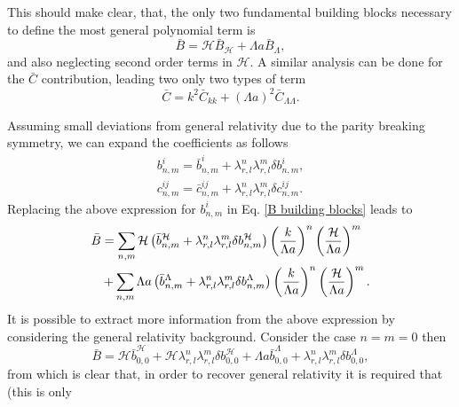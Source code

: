 \documentclass{article}
\begin{document}
This should make clear, that, the only two fundamental building blocks necessary to define the most
general polynomial term is
\begin{equation}
    \label{B building blocks}
    \bar{B} = \mathcal{H}\bar{B}_{\mathcal{H}} + \Lambda a \bar{B}_{\Lambda},
\end{equation}
and also neglecting second order terms in $\mathcal{H}$. A similar analysis can be done for the 
$\bar{C}$ contribution, leading two only two types of term
\begin{equation}
    \label{C building blocks}
    \bar{C} = k^2 \bar{C}_{kk} + \left(\Lambda a\right)^2 \bar{C}_{\Lambda\Lambda}.
\end{equation}

Assuming small deviations from general relativity due to the parity breaking symmetry, we can expand
the coefficients as follows
\begin{align}
    b^{i}_{n,m} = \bar{b}^{i}_{n,m} + \lambda^{n}_{r,l}\lambda^{m}_{r,l} \delta b^{i}_{n,m} \label{B deviation},\\
    c^{ij}_{n,m} = \bar{c}^{ij}_{n,m} + \lambda^{n}_{r,l}\lambda^{m}_{r,l} \delta c^{ij}_{n,m} \label{C deviation}.
\end{align}
Replacing the above expression for $b^{i}_{n,m}$ in Eq. \eqref{B building blocks} leads to
\begin{align}
    \label{gw equation pv}
    \bar{B} & = \sum_{n,m} \mathcal{H}\left(\bar{b}^{\mathcal{H}}_{n,m} 
    + \lambda^{n}_{r,l}\lambda^{m}_{r,l} \delta b^{\mathcal{H}}_{n,m}\right)
    \left(\frac{k}{\Lambda a}\right)^{n}\left(\frac{\mathcal{H}}{\Lambda a}\right)^{m} \notag \\
    & + \sum_{n,m} \Lambda a \left(\bar{b}^{\Lambda}_{n,m} 
    + \lambda^{n}_{r,l}\lambda^{m}_{r,l} \delta b^{\Lambda}_{n,m}\right)
    \left(\frac{k}{\Lambda a}\right)^{n}\left(\frac{\mathcal{H}}{\Lambda a}\right)^{m}.
\end{align}
It is possible to extract more information from the above expression by considering the general
relativity background. Consider the case $n = m = 0$ then
\begin{equation}
    \bar{B} = \mathcal{H}\bar{b}^{\mathcal{H}}_{0,0} + \mathcal{H} 
    \lambda^{n}_{r,l}\lambda^{m}_{r,l} \delta b^{\mathcal{H}}_{0,0} +
    \Lambda a \bar{b}^{\Lambda}_{0,0} 
    + \lambda^{n}_{r,l}\lambda^{m}_{r,l} \delta b^{\Lambda}_{0,0}, 
\end{equation}
from which is clear that, in order to recover general relativity it is required that (this is only
\end{document}
